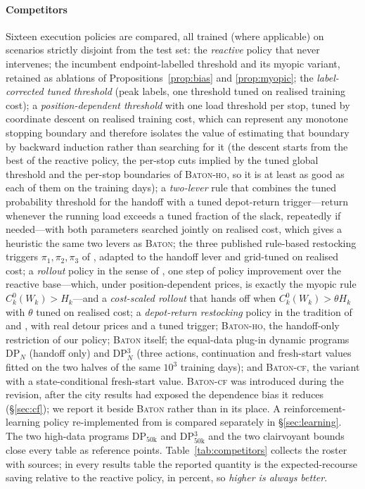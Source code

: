 \documentclass[preprint,authoryear,12pt]{elsarticle}
\theoremstyle{definition}
\theoremstyle{remark}
\begin{document}
\paragraph{Competitors} Sixteen execution policies are compared, all
trained (where applicable) on scenarios strictly disjoint from the test
set: the \emph{reactive} policy that never intervenes; the incumbent
endpoint-labelled threshold and its myopic variant, retained as
ablations of Propositions~\ref{prop:bias} and \ref{prop:myopic}; the
\emph{label-corrected tuned threshold} (peak labels, one threshold tuned
on realised training cost); a \emph{position-dependent threshold} with
one load threshold per stop, tuned by coordinate descent on realised
training cost, which can represent any monotone stopping boundary and
therefore isolates the value of estimating that boundary by backward
induction rather than searching for it (the descent starts from the
best of the reactive policy, the per-stop cuts implied by the tuned
global threshold and the per-stop boundaries of \textsc{Baton-ho}, so
it is at least as good as each of them on the training days); a
\emph{two-lever} rule that combines the tuned probability threshold for
the handoff with a tuned depot-return trigger---return whenever the
running load exceeds a tuned fraction of the slack, repeatedly if
needed---with both parameters searched jointly on realised cost, which
gives a heuristic the same two levers as \textsc{Baton}; the three published rule-based
restocking triggers $\pi_1, \pi_2, \pi_3$ of \citet{salavati2019rule},
adapted to the handoff lever and grid-tuned on realised cost; a
\emph{rollout} policy in the sense of \citet{secomandi2001rollout}, one
step of policy improvement over the reactive base---which, under
position-dependent prices, is exactly the myopic rule
$C^0_k(W_k) > H_k$---and a \emph{cost-scaled rollout} that hands off
when $C^0_k(W_k) > \theta H_k$ with $\theta$ tuned on realised cost; a
\emph{depot-return restocking} policy in the tradition of
\citet{yang2000stochastic} and \citet{florio2020new}, with real detour
prices and a tuned trigger; \textsc{Baton-ho}, the handoff-only
restriction of our policy; \textsc{Baton} itself; the equal-data
plug-in dynamic programs DP$_{N}$ (handoff only) and DP$^3_N$ (three
actions, continuation and fresh-start values fitted on the two halves of
the same $10^3$ training days); and \textsc{Baton-cf}, the variant with a
state-conditional fresh-start value. \textsc{Baton-cf} was introduced
during the revision, after the city results had exposed the dependence
bias it reduces (\S\ref{sec:cf}); we report it beside \textsc{Baton}
rather than in its place.
A reinforcement-learning policy re-implemented from
\citet{iklassov2024rl} is compared separately in \S\ref{sec:learning}.
The two high-data programs DP$_{50\mathrm{k}}$ and DP$^3_{50\mathrm{k}}$
and the two clairvoyant bounds close every table as reference points.
Table~\ref{tab:competitors} collects the roster with sources; in every
results table the reported quantity is the expected-recourse saving
relative to the reactive policy, in percent, so \emph{higher is always
better}.
\end{document}
